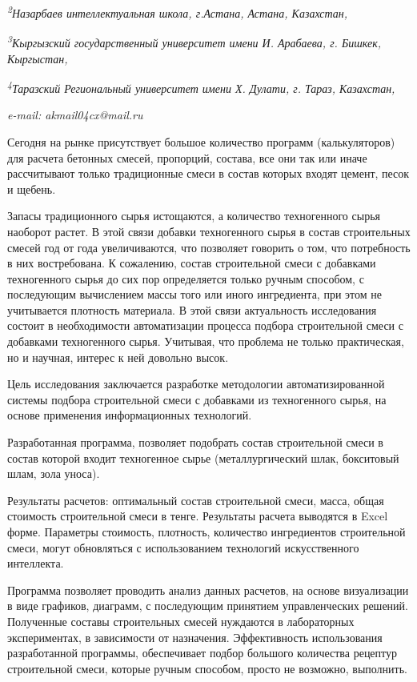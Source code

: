 {\emph{\textsuperscript{2}Назарбаев интеллектуальная школа, г.Астана,
Астана, Казахстан,}

\emph{\textsuperscript{3}Кыргызский государственный университет имени И.
Арабаева, г. Бишкек, Кыргыстан,}

\emph{\textsuperscript{4}Таразский Региональный университет имени Х.
Дулати, г. Тараз, Казахстан,}

\emph{e-mail: akmail04cx@mail.ru}

Сегодня на рынке присутствует большое количество программ
(калькуляторов) для расчета бетонных смесей, пропорций, состава, все они
так или иначе рассчитывают только традиционные смеси в состав которых
входят цемент, песок и щебень.

Запасы традиционного сырья истощаются, а количество техногенного сырья
наоборот растет. В этой связи добавки техногенного сырья в состав
строительных смесей год от года увеличиваются, что позволяет говорить о
том, что потребность в них востребована. К сожалению, состав
строительной смеси с добавками техногенного сырья до сих пор
определяется только ручным способом, с последующим вычислением массы
того или иного ингредиента, при этом не учитывается плотность материала.
В этой связи актуальность исследования состоит в необходимости
автоматизации процесса подбора строительной смеси с добавками
техногенного сырья. Учитывая, что проблема не только практическая, но и
научная, интерес к ней довольно высок.

Цель исследования заключается разработке методологии автоматизированной
системы подбора строительной смеси с добавками из техногенного сырья, на
основе применения информационных технологий.

Разработанная программа, позволяет подобрать состав строительной смеси в
состав которой входит техногенное сырье (металлургический шлак,
бокситовый шлам, зола уноса).

Результаты расчетов: оптимальный состав строительной смеси, масса, общая
стоимость строительной смеси в тенге. Результаты расчета выводятся в
Excel форме. Параметры стоимость, плотность, количество ингредиентов
строительной смеси, могут обновляться с использованием технологий
искусственного интеллекта.

Программа позволяет проводить анализ данных расчетов, на основе
визуализации в виде графиков, диаграмм, с последующим принятием
управленческих решений. Полученные составы строительных смесей нуждаются
в лабораторных экспериментах, в зависимости от назначения. Эффективность
использования разработанной программы, обеспечивает подбор большого
количества рецептур строительной смеси, которые ручным способом, просто
не возможно, выполнить.

}
